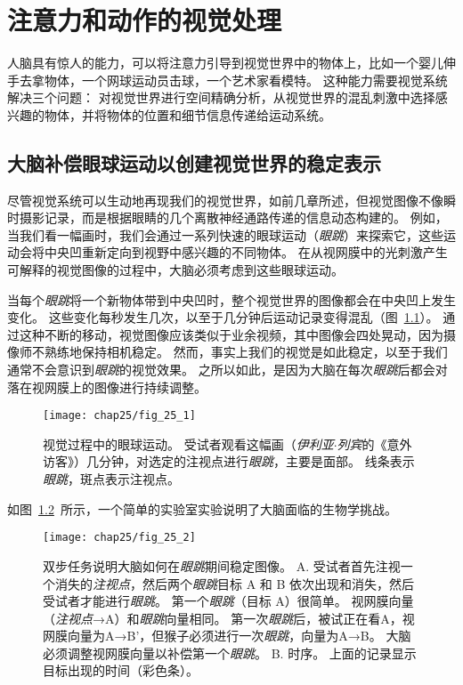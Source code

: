 \chapter{注意力和动作的视觉处理} \label{chap:chap25}

人脑具有惊人的能力，可以将注意力引导到视觉世界中的物体上，比如一个婴儿伸手去拿物体，一个网球运动员击球，一个艺术家看模特。
这种能力需要视觉系统解决三个问题：
对视觉世界进行空间精确分析，从视觉世界的混乱刺激中选择感兴趣的物体，并将物体的位置和细节信息传递给运动系统。



\section{大脑补偿眼球运动以创建视觉世界的稳定表示}

尽管视觉系统可以生动地再现我们的视觉世界，如前几章所述，但视觉图像不像瞬时摄影记录，而是根据眼睛的几个离散神经通路传递的信息动态构建的。
例如，当我们看一幅画时，我们会通过一系列快速的眼球运动（\textit{眼跳}）来探索它，这些运动会将中央凹重新定向到视野中感兴趣的不同物体。
在从视网膜中的光刺激产生可解释的视觉图像的过程中，大脑必须考虑到这些眼球运动。


当每个\textit{眼跳}将一个新物体带到中央凹时，整个视觉世界的图像都会在中央凹上发生变化。
这些变化每秒发生几次，以至于几分钟后运动记录变得混乱（图~\ref{fig:25_1}）。
通过这种不断的移动，视觉图像应该类似于业余视频，其中图像会四处晃动，因为摄像师不熟练地保持相机稳定。
然而，事实上我们的视觉是如此稳定，以至于我们通常不会意识到\textit{眼跳}的视觉效果。
之所以如此，是因为大脑在每次\textit{眼跳}后都会对落在视网膜上的图像进行持续调整。


\begin{figure}[htbp]
	\centering
	\texttt{[image: chap25/fig\_25\_1]}
	\caption{视觉过程中的眼球运动。
		受试者观看这幅画（\textit{伊利亚$\cdot$列宾}的《意外访客》）几分钟，对选定的注视点进行\textit{眼跳}，主要是面部。
		线条表示\textit{眼跳}，斑点表示注视点。}
	\label{fig:25_1}
\end{figure}


如图~\ref{fig:25_2}~所示，一个简单的实验室实验说明了大脑面临的生物学挑战。


\begin{figure}[htbp]
	\centering
	\texttt{[image: chap25/fig\_25\_2]}
	\caption{双步任务说明大脑如何在\textit{眼跳}期间稳定图像。
		A. 受试者首先注视一个消失的\textit{注视点}，然后两个\textit{眼跳}目标 A 和 B 依次出现和消失，然后受试者才能进行\textit{眼跳}。
		第一个\textit{眼跳}（目标 A）很简单。
		视网膜向量（\textit{注视点}→A）和\textit{眼跳}向量相同。
		第一次\textit{眼跳}后，被试正在看A，视网膜向量为A→B'，但猴子必须进行一次\textit{眼跳}，向量为A→B。
		大脑必须调整视网膜向量以补偿第一个\textit{眼跳}。
		B. 时序。
		上面的记录显示目标出现的时间（彩色条）。}
	\label{fig:25_2}
\end{figure}



